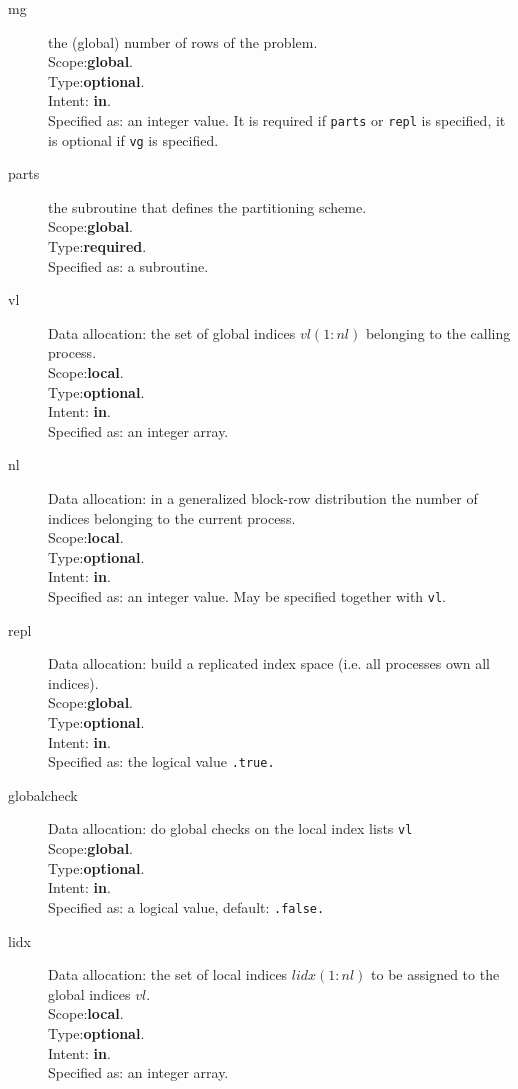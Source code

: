 \begin{description}
\item[mg] the (global) number of rows of the problem.\\
Scope:{\bf global}.\\
Type:{\bf optional}.\\
Intent: {\bf in}.\\
Specified as: an integer value. It is required if \verb|parts| or
\verb|repl| is specified, it is optional if \verb|vg| is specified. 
\item[parts] the subroutine that defines the partitioning scheme.\\
Scope:{\bf global}.\\
Type:{\bf required}.\\
Specified as: a subroutine. 
\item[vl] Data allocation: the set of global indices 
  $vl(1:nl)$ belonging to the calling process. \\
Scope:{\bf local}.\\
Type:{\bf optional}.\\
Intent: {\bf in}.\\
Specified as: an integer array. 
\item[nl] Data allocation: in a generalized block-row distribution the
  number of indices belonging to the current process. \\
Scope:{\bf local}.\\
Type:{\bf optional}.\\
Intent: {\bf in}.\\
Specified as: an integer value. May be specified together with
\verb|vl|. 
\item[repl] Data allocation: build a replicated index space 
  (i.e. all processes own all indices).\\
Scope:{\bf global}.\\
Type:{\bf optional}.\\
Intent: {\bf in}.\\
Specified as: the logical value \verb|.true.|
\item[globalcheck] Data allocation: do global checks on the local
  index lists \verb|vl|\\
Scope:{\bf global}.\\
Type:{\bf optional}.\\
Intent: {\bf in}.\\
Specified as: a logical value, default: \verb|.false.|
\item[lidx] Data allocation: the set of local  indices 
  $lidx(1:nl)$ to be assigned to the global indices $vl$. \\
Scope:{\bf local}.\\
Type:{\bf optional}.\\
Intent: {\bf in}.\\
Specified as: an integer array. 
\end{description}

